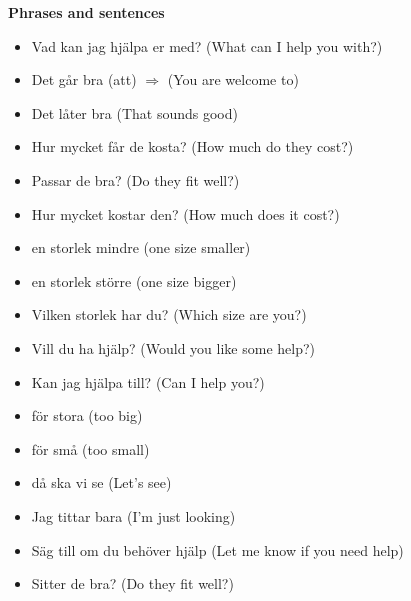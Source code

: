 
\begin{flushleft}
    \textbf{Phrases and sentences}
    \begin{itemize}
        \item Vad kan jag hjälpa er med? (What can I help you with?)
        \item Det går bra (att) $\Rightarrow$ (You are welcome to)
        \item Det låter bra (That sounds good)
        \item Hur mycket får de kosta? (How much do they cost?)
        \item Passar de bra? (Do they fit well?)
        \item Hur mycket kostar den? (How much does it cost?)
        \item en storlek mindre (one size smaller)
        \item en storlek större (one size bigger)
        \item Vilken storlek har du? (Which size are you?)
        \item Vill du ha hjälp? (Would you like some help?)
        \item Kan jag hjälpa till? (Can I help you?)
        \item för stora (too big)
        \item för små (too small)
        \item då ska vi se (Let's see)
        \item Jag tittar bara (I'm just looking)
        \item Säg till om du behöver hjälp (Let me know if you need help)
        \item Sitter de bra? (Do they fit well?)
    \end{itemize}
\end{flushleft}

